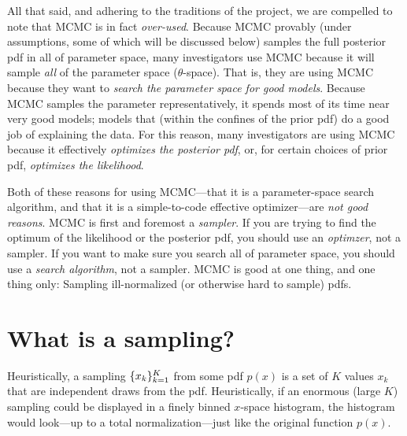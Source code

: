 \documentclass[12pt,twoside,pdftex]{article}
\newcommand{\pars}{\theta}
\begin{document}
All that said, and adhering to the traditions of the  project, we are
compelled to note that MCMC is in fact \emph{over-used}.
Because MCMC provably (under assumptions, some of which will be discussed below) samples the full
posterior pdf in all of parameter space, many investigators use MCMC
because it will sample \emph{all} of the parameter space
($\pars$-space).
That is, they are using MCMC because they want to
\emph{search the parameter space for good models}.
Because MCMC samples the parameter representatively, it spends most of
its time near very good models; models that (within the confines of
the prior pdf) do a good job of explaining the data.
For this reason, many investigators are using MCMC because it
effectively \emph{optimizes the posterior pdf}, or, for certain
choices of prior pdf, \emph{optimizes the likelihood}.

Both of these reasons for using MCMC---that it is a parameter-space
search algorithm, and that it is a simple-to-code effective
optimizer---are \emph{not good reasons}.  MCMC is first and foremost a
\emph{sampler}.  If you are trying to find the optimum of the
likelihood or the posterior pdf, you should use an \emph{optimzer},
not a sampler.  If you want to make sure you search all of parameter
space, you should use a \emph{search algorithm}, not a sampler.  MCMC
is good at one thing, and one thing only: Sampling ill-normalized (or
otherwise hard to sample) pdfs.

\section{What is a sampling?}

Heuristically, a sampling $\{{x_k}\}_{k=1}^K$ from some pdf $p(x)$
is a set of $K$ values $x_k$ that are independent draws from the pdf.
Heuristically, if an enormous (large $K$) sampling could be displayed
in a finely binned $x$-space histogram, the histogram would look---up
to a total normalization---just like the original function $p(x)$.
\end{document}
